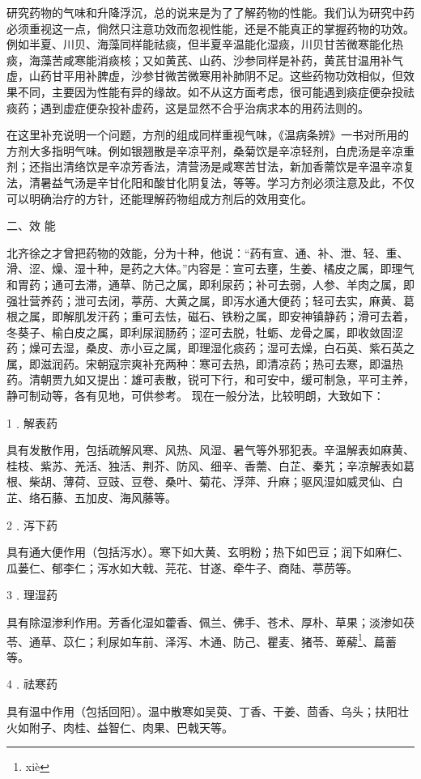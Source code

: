 \documentclass[12pt,UTF8]{ctexbook}
\begin{document}
研究药物的气味和升降浮沉，总的说来是为了了解药物的性能。我们认为研究中药必须重视这一点，倘然只注意功效而忽视性能，还是不能真正的掌握药物的功效。例如半夏、川贝、海藻同样能祛痰，但半夏辛温能化湿痰，川贝甘苦微寒能化热痰，海藻苦咸寒能消痰核；又如黄芪、山药、沙参同样是补药，黄芪甘温用补气虚，山药甘平用补脾虚，沙参甘微苦微寒用补肺阴不足。这些药物功效相似，但效果不同，主要因为性能有异的缘故。如不从这方面考虑，很可能遇到痰症便杂投祛痰药；遇到虚症便杂投补虚药，这是显然不合乎治病求本的用药法则的。

在这里补充说明一个问题，方剂的组成同样重视气味，《温病条辨》一书对所用的方剂大多指明气味。例如银翘散是辛凉平剂，桑菊饮是辛凉轻剂，白虎汤是辛凉重剂；还指出清络饮是辛凉芳香法，清营汤是咸寒苦甘法，新加香薷饮是辛温辛凉复法，清暑益气汤是辛甘化阳和酸甘化阴复法，等等。学习方剂必须注意及此，不仅可以明确治疗的方针，还能理解药物组成方剂后的效用变化。

二、效 能

北齐徐之才曾把药物的效能，分为十种，他说：“药有宣、通、补、泄、轻、重、滑、涩、燥、湿十种，是药之大体。”内容是：宣可去壅，生姜、橘皮之属，即理气和胃药；通可去滞，通草、防己之属，即利尿药；补可去弱，人参、羊肉之属，即强壮营养药；泄可去闭，葶苈、大黄之属，即泻水通大便药；轻可去实，麻黄、葛根之属，即解肌发汗药；重可去怯，磁石、铁粉之属，即安神镇静药；滑可去着，冬葵子、榆白皮之属，即利尿润肠药；涩可去脱，牡蛎、龙骨之属，即收敛固涩药；燥可去湿，桑皮、赤小豆之属，即理湿化痰药；湿可去燥，白石英、紫石英之属，即滋润药。宋朝寇宗爽补充两种：寒可去热，即清凉药；热可去寒，即温热药。清朝贾九如又提出：雄可表散，锐可下行，和可安中，缓可制急，平可主养，静可制动等，各有见地，可供参考。
现在一般分法，比较明朗，大致如下：

1﹒解表药

具有发散作用，包括疏解风寒、风热、风湿、暑气等外邪犯表。辛温解表如麻黄、桂枝、紫苏、羌活、独活、荆芥、防风、细辛、香薷、白芷、秦艽；辛凉解表如葛根、柴胡、薄荷、豆豉、豆卷、桑叶、菊花、浮萍、升麻；驱风湿如威灵仙、白芷、络石藤、五加皮、海风藤等。

2﹒泻下药

具有通大便作用（包括泻水）。寒下如大黄、玄明粉；热下如巴豆；润下如麻仁、瓜蒌仁、郁李仁；泻水如大戟、芫花、甘遂、牵牛子、商陆、葶苈等。

3﹒理湿药

具有除湿渗利作用。芳香化湿如藿香、佩兰、佛手、苍术、厚朴、草果；淡渗如茯苓、通草、苡仁；利尿如车前、泽泻、木通、防己、瞿麦、猪苓、萆薢\footnote{xi\`e}、萹蓄等。

4﹒祛寒药

具有温中作用（包括回阳）。温中散寒如吴萸、丁香、干姜、茴香、乌头；扶阳壮火如附子、肉桂、益智仁、肉果、巴戟天等。
\end{document}
